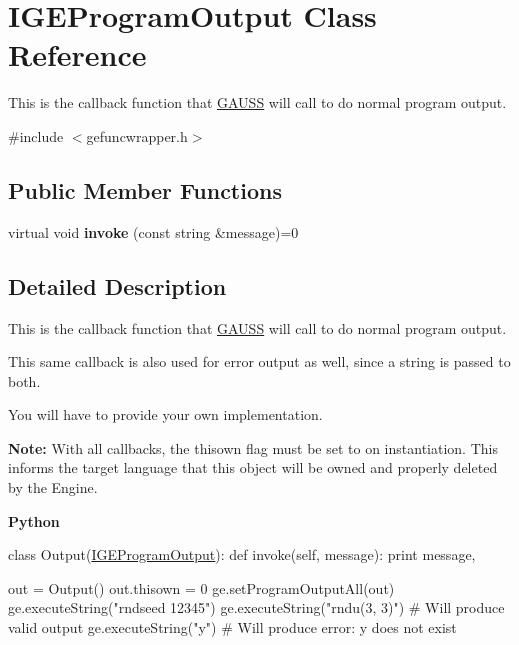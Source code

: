 \hypertarget{class_i_g_e_program_output}{}\section{I\+G\+E\+Program\+Output Class Reference}
\label{class_i_g_e_program_output}


This is the callback function that \hyperlink{class_g_a_u_s_s}{G\+A\+U\+SS} will call to do normal program output.  




{\ttfamily \#include $<$gefuncwrapper.\+h$>$}

\subsection*{Public Member Functions}
\begin{DoxyCompactItemize}
\item 
\mbox{\label{class_i_g_e_program_output_a04329081be6af1ccb5921dd74bf19fc5}} 
virtual void {\bfseries invoke} (const string \&message)=0
\end{DoxyCompactItemize}


\subsection{Detailed Description}
This is the callback function that \hyperlink{class_g_a_u_s_s}{G\+A\+U\+SS} will call to do normal program output. 

This same callback is also used for error output as well, since a string is passed to both.

You will have to provide your own implementation.

{\bfseries Note\+:} With all callbacks, the {\ttfamily thisown} flag must be set to {} on instantiation. This informs the target language that this object will be owned and properly deleted by the Engine.

{\bfseries Python} 
\begin{DoxyCode}
\textcolor{keyword}{class }Output(\hyperlink{class_i_g_e_program_output}{IGEProgramOutput}):
    \textcolor{keyword}{def }invoke(self, message):
        \textcolor{keywordflow}{print} message,

out = Output()
out.thisown = 0
ge.setProgramOutputAll(out)
ge.executeString(\textcolor{stringliteral}{"rndseed 12345"})
ge.executeString(\textcolor{stringliteral}{"rndu(3, 3)"})  \textcolor{comment}{# Will produce valid output}
ge.executeString(\textcolor{stringliteral}{"y"})           \textcolor{comment}{# Will produce error: y does not exist}
\end{DoxyCode}


